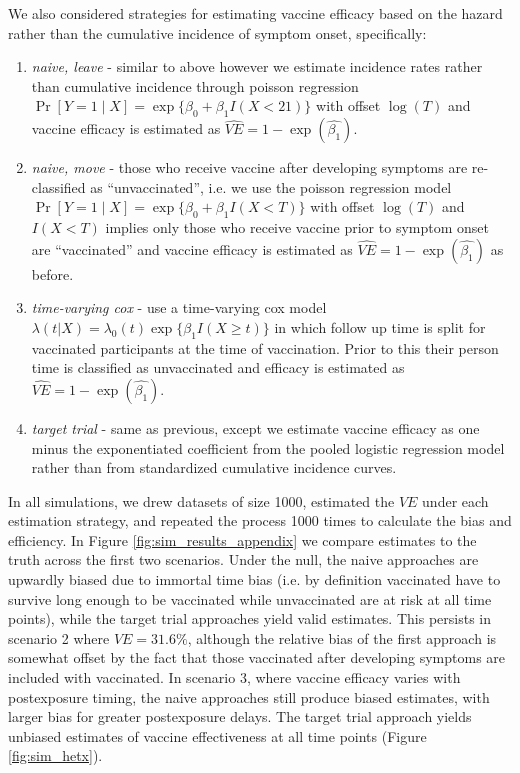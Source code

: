 \begin{appendix}
    We also considered strategies for estimating vaccine efficacy based on the hazard rather than the cumulative incidence of symptom onset, specifically:
    \begin{enumerate}
        \item \textit{naive, leave} - similar to above however we estimate incidence rates rather than cumulative incidence through poisson regression $\Pr[Y = 1 \mid X] = \operatorname{exp}\{\beta_0 + \beta_1 I(X < 21)\}$ with offset $\log(T)$ and vaccine efficacy is estimated as $\widehat{VE} = 1 - \exp(\widehat{\beta_1})$.
        \item \textit{naive, move} - those who receive vaccine after developing symptoms are re-classified as ``unvaccinated'', i.e. we use the poisson regression model $\Pr[Y = 1 \mid X] = \operatorname{exp}\{\beta_0 + \beta_1 I(X < T)\}$ with offset $\log(T)$ and $I(X<T)$ implies only those who receive vaccine prior to symptom onset are ``vaccinated'' and vaccine efficacy is estimated as $\widehat{VE} = 1 - \exp(\widehat{\beta_1})$ as before.
        \item \textit{time-varying cox} - use a time-varying cox model $\lambda(t|X) = \lambda_0(t) \exp\{\beta_1 I(X \geq t)\}$ in which follow up time is split for vaccinated participants at the time of vaccination. Prior to this their person time is classified as unvaccinated and efficacy is estimated as $\widehat{VE} = 1 - \exp(\widehat{\beta_1})$.
        \item \textit{target trial} - same as previous, except  we estimate vaccine efficacy as one minus the exponentiated coefficient from the pooled logistic regression model rather than from standardized cumulative incidence curves.
    \end{enumerate}

    In all simulations, we drew datasets of size 1000, estimated the $VE$ under each estimation strategy, and repeated the process 1000 times to calculate the bias and efficiency. In Figure \ref{fig:sim_results_appendix} we compare estimates to the truth across the first two scenarios. Under the null, the naive approaches are upwardly biased due to immortal time bias (i.e. by definition vaccinated have to survive long enough to be vaccinated while unvaccinated are at risk at all time points), while the target trial approaches yield valid estimates. This persists in scenario 2 where $VE = 31.6\%$, although the relative bias of the first approach is somewhat offset by the fact that those vaccinated after developing symptoms are included with vaccinated. In scenario 3, where vaccine efficacy varies with postexposure timing, the naive approaches still produce biased estimates, with larger bias for greater postexposure delays. The target trial approach yields unbiased estimates of vaccine effectiveness at all time points (Figure \ref{fig:sim_hetx}). 


\end{appendix}
